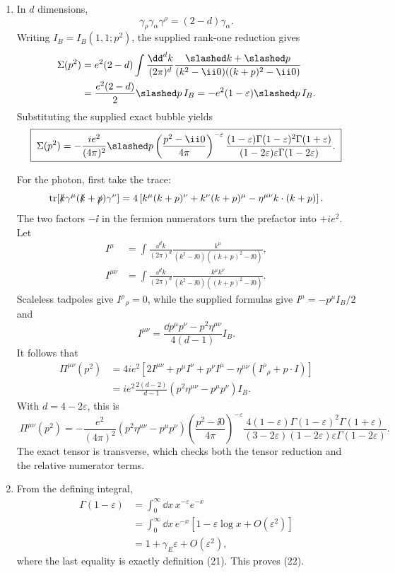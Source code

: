 \begin{enumerate}
\begin{enumerate}
\item
In \(d\) dimensions,
\[
 \gamma_\rho\gamma_\alpha\gamma^\rho=(2-d)\gamma_\alpha.
\]
Writing \(I_B=I_B(1,1;p^2)\), the supplied rank-one reduction gives
\[
\begin{aligned}
 \Sigma(p^2)
 &=e^2(2-d)\int\frac{\dd^dk}{(2\pi)^d}
 \frac{\slashed k+\slashed p}
 {(k^2-\ii0)((k+p)^2-\ii0)}\\
 &=\frac{e^2(2-d)}2\slashed p\,I_B
 =-e^2(1-\varepsilon)\slashed p\,I_B.
\end{aligned}
\]
Substituting the supplied exact bubble yields
\[
 \boxed{\;
 \Sigma(p^2)
 =-\frac{ie^2}{(4\pi)^2}\slashed p
 \left(\frac{p^2-\ii0}{4\pi}\right)^{-\varepsilon}
 \frac{(1-\varepsilon)\Gamma(1-\varepsilon)^2
 \Gamma(1+\varepsilon)}
 {(1-2\varepsilon)\varepsilon\Gamma(1-2\varepsilon)}.
 \;}
\]

For the photon, first take the trace:
\[
 \operatorname{tr}[\slashed k\gamma^\mu
 (\slashed k+\slashed p)\gamma^\nu]
 =4\left[k^\mu(k+p)^\nu+k^\nu(k+p)^\mu
 -\eta^{\mu\nu}k\cdot(k+p)\right].
\]
The two factors \(-\ii\) in the fermion numerators turn the prefactor into
\(+ie^2\).  Let
\[
 \begin{aligned}
 I^\mu&=\int\frac{\dd^dk}{(2\pi)^d}
 \frac{k^\mu}{(k^2-\ii0)((k+p)^2-\ii0)},\\
 I^{\mu\nu}&=\int\frac{\dd^dk}{(2\pi)^d}
 \frac{k^\mu k^\nu}{(k^2-\ii0)((k+p)^2-\ii0)}.
 \end{aligned}
\]
Scaleless tadpoles give
\(I^\rho{}_{\rho}=0\), while the supplied formulas give
\(I^\mu=-p^\mu I_B/2\) and
\[
 I^{\mu\nu}=\frac{\dd p^\mu p^\nu-p^2\eta^{\mu\nu}}
 {4(d-1)}I_B.
\]
It follows that
\[
\begin{aligned}
 \Pi^{\mu\nu}(p^2)
 &=4ie^2\left[2I^{\mu\nu}+p^\mu I^\nu+p^\nu I^\mu
 -\eta^{\mu\nu}(I^\rho{}_{\rho}+p\cdot I)\right]\\
 &=ie^2\frac{2(d-2)}{d-1}
 (p^2\eta^{\mu\nu}-p^\mu p^\nu)I_B.
\end{aligned}
\]
With \(d=4-2\varepsilon\), this is
\[
 \boxed{\;
 \Pi^{\mu\nu}(p^2)
 =-\frac{e^2}{(4\pi)^2}
 (p^2\eta^{\mu\nu}-p^\mu p^\nu)
 \left(\frac{p^2-\ii0}{4\pi}\right)^{-\varepsilon}
 \frac{4(1-\varepsilon)\Gamma(1-\varepsilon)^2
 \Gamma(1+\varepsilon)}
 {(3-2\varepsilon)(1-2\varepsilon)\varepsilon
 \Gamma(1-2\varepsilon)}.
 \;}
\]
The exact tensor is transverse, which checks both the tensor reduction and
the relative numerator terms.

\item
From the defining integral,
\[
\begin{aligned}
 \Gamma(1-\varepsilon)
 &=\int_0^\infty \dd x\,x^{-\varepsilon}e^{-x}\\
 &=\int_0^\infty \dd x\,e^{-x}
 \left[1-\varepsilon\log x+O(\varepsilon^2)\right]\\
 &=1+\gamma_E\varepsilon+O(\varepsilon^2),
\end{aligned}
\]
where the last equality is exactly definition (21).  This proves (22).


\end{enumerate}
\end{enumerate}
